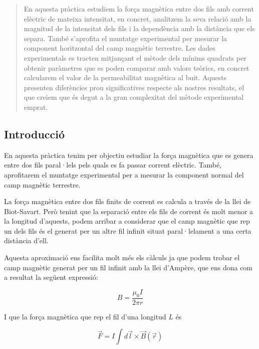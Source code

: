 \documentclass[11pt]{article}
\numberwithin{equation}{section}
\numberwithin{figure}{section}
\numberwithin{table}{section}
\begin{document}
\vspace{1em}  %

\begin{abstract}
    En aquesta pràctica estudiem la força magnètica entre dos fils amb corrent elèctric de mateixa intensitat, en concret, analitzem la seva relació amb la magnitud de la intensitat dels fils i la dependència amb la distància que els separa. També s'aprofita el muntatge experimental per mesurar la component horitzontal del camp magnètic terrestre. Les dades experimentals es tracten mitjançant el mètode dels mínims quadrats per obtenir paràmetres que es poden comparar amb valors teòrics, en concret calcularem el valor de la permeabilitat magnètica al buit. Aquests presenten diferències prou significatives respecte als nostres resultats, el que creiem que és degut a la gran complexitat del mètode experimental emprat.
\end{abstract}

\subsection{Introducció}\label{sec: PR2_intro}

En aquesta pràctica tenim per objectiu estudiar la força magnètica que es genera entre dos fils paral·lels pels quals es fa passar corrent elèctric. També, aprofitarem el muntatge experimental per a mesurar la component normal del camp magnètic terrestre.

La força magnètica entre dos fils finits de corrent es calcula a través de la llei de Biot-Savart. Però tenint que la separació entre els fils de corrent és molt menor a la longitud d'aquests, podem arribar a considerar que el camp magnètic que rep un dels fils és el generat per un altre fil infinit situat paral·lelament a una certa distància d'ell. 

Aquesta aproximació ens facilita molt més els càlculs ja que podem trobar el camp magnètic generat per un fil infinit amb la llei d'Ampère, que ens dona com a resultat la següent expressió:

\begin{equation}\label{eq_PR2: PR2_camp_fil_infinit}
    B = \frac{\mu_0I}{2\pi r}
\end{equation}

I que la força magnètica que rep el fil d'una longitud $L$ és

\begin{equation}\label{eq: PR2_Fmagn_en_funcio_B}
    \vec{F} = I\int d\vec{l}\times\vec{B}(\vec{r})
\end{equation}
\end{document}

